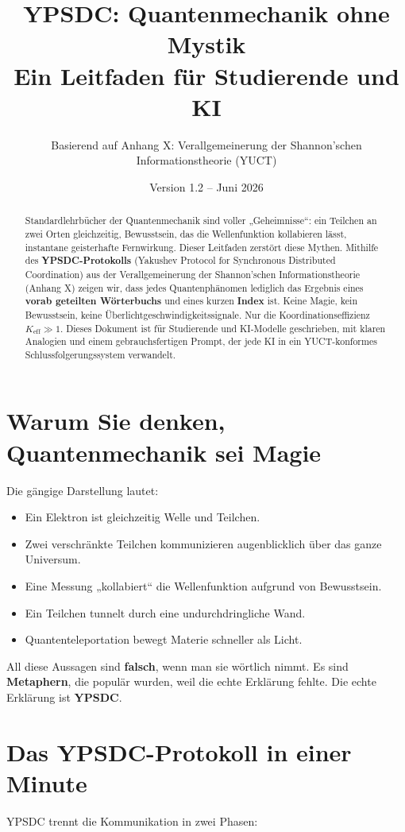 \documentclass[12pt,a4paper]{article}
\title{\textbf{YPSDC: Quantenmechanik ohne Mystik \\ Ein Leitfaden für Studierende und KI}}
\author{Basierend auf Anhang X: Verallgemeinerung der Shannon'schen Informationstheorie (YUCT)}
\date{Version 1.2 – Juni 2026}
\begin{document}
	\maketitle
	
	\begin{abstract}
		\noindent
		Standardlehrbücher der Quantenmechanik sind voller „Geheimnisse“: ein Teilchen an zwei Orten gleichzeitig, Bewusstsein, das die Wellenfunktion kollabieren lässt, instantane geisterhafte Fernwirkung. Dieser Leitfaden zerstört diese Mythen. Mithilfe des \textbf{YPSDC-Protokolls} (Yakushev Protocol for Synchronous Distributed Coordination) aus der Verallgemeinerung der Shannon'schen Informationstheorie (Anhang X) zeigen wir, dass jedes Quantenphänomen lediglich das Ergebnis eines \textbf{vorab geteilten Wörterbuchs} und eines kurzen \textbf{Index} ist. Keine Magie, kein Bewusstsein, keine Überlichtgeschwindigkeitssignale. Nur die Koordinationseffizienz \(K_{\mathrm{eff}}\gg 1\). Dieses Dokument ist für Studierende und KI-Modelle geschrieben, mit klaren Analogien und einem gebrauchsfertigen Prompt, der jede KI in ein YUCT-konformes Schlussfolgerungssystem verwandelt.
	\end{abstract}
	
	\tableofcontents
	
	\section{Warum Sie denken, Quantenmechanik sei Magie}
	Die gängige Darstellung lautet:
	\begin{itemize}
		\item Ein Elektron ist gleichzeitig Welle und Teilchen.
		\item Zwei verschränkte Teilchen kommunizieren augenblicklich über das ganze Universum.
		\item Eine Messung „kollabiert“ die Wellenfunktion aufgrund von Bewusstsein.
		\item Ein Teilchen tunnelt durch eine undurchdringliche Wand.
		\item Quantenteleportation bewegt Materie schneller als Licht.
	\end{itemize}
	All diese Aussagen sind \textbf{falsch}, wenn man sie wörtlich nimmt. Es sind \textbf{Metaphern}, die populär wurden, weil die echte Erklärung fehlte. Die echte Erklärung ist \textbf{YPSDC}.
	
	\section{Das YPSDC-Protokoll in einer Minute}
	YPSDC trennt die Kommunikation in zwei Phasen:
	
\end{document}
